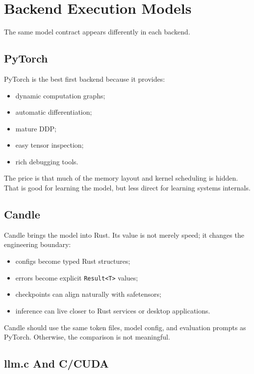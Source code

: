 \section{Backend Execution Models}

The same model contract appears differently in each backend.

\subsection{PyTorch}

PyTorch is the best first backend because it provides:

\begin{itemize}
  \item dynamic computation graphs;
  \item automatic differentiation;
  \item mature DDP;
  \item easy tensor inspection;
  \item rich debugging tools.
\end{itemize}

The price is that much of the memory layout and kernel scheduling is hidden. That is good
for learning the model, but less direct for learning systems internals.

\subsection{Candle}

Candle brings the model into Rust. Its value is not merely speed; it changes the
engineering boundary:

\begin{itemize}
  \item configs become typed Rust structures;
  \item errors become explicit \texttt{Result<T>} values;
  \item checkpoints can align naturally with safetensors;
  \item inference can live closer to Rust services or desktop applications.
\end{itemize}

Candle should use the same token files, model config, and evaluation prompts as PyTorch.
Otherwise, the comparison is not meaningful.

\subsection{llm.c And C/CUDA}

